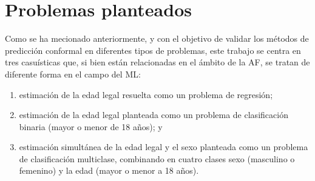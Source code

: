 




\section{Problemas planteados}

Como se ha mecionado anteriormente, y con el objetivo de validar los métodos de predicción conformal en 
diferentes tipos de problemas, este trabajo se centra en tres casuísticas que, si bien están relacionadas en 
el ámbito de la AF, se tratan de diferente forma en el campo del ML: 

\begin{enumerate}
    \item estimación de la edad legal resuelta como un problema de regresión; 
    \item estimación de la edad legal planteada como un problema de clasificación binaria (mayor o menor de 
    18 años); y 
    \item estimación simultánea de la edad legal y el sexo planteada como un problema de clasificación 
    multiclase, combinando en cuatro clases sexo (masculino o femenino) y la edad (mayor o menor a 18 años).
\end{enumerate}

